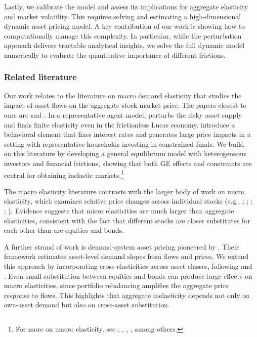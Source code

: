 Lastly, we calibrate the model and assess its implications for aggregate elasticity and market volatility. This requires solving and estimating a high-dimensional dynamic asset pricing model. A key contribution of our work is showing how to computationally manage this complexity. In particular, while the perturbation approach delivers tractable analytical insights, we solve the full dynamic model numerically to evaluate the quantitative importance of different frictions.




\subsubsection*{Related literature}
Our work relates to the literature on macro demand elasticity that studies the impact of asset flows on the aggregate stock market price. The papers closest to ours are \cite{johnson2006dynamic} and \cite{gabaix2020search}. In a representative agent model, \cite{johnson2006dynamic} perturbs the risky asset supply and finds finite elasticity even in the frictionless Lucas economy. \cite{gabaix2020search} introduce a behavioral element that fixes interest rates and generates large price impacts in a setting with representative households investing in constrained funds. We build on this literature by developing a general equilibrium model with heterogeneous investors and financial frictions, showing that both GE effects and constraints are central for obtaining inelastic markets.\footnote{For more on macro elasticity, see \cite{johnson2008volume,johnson2009liquid}, \cite{Deuskar/Johnson/2011}, \cite{Li/Pearson/Zhang/2020}, \cite{Hartzmark/Solomon/2021}, among others.} 

The macro elasticity literature contrasts with the larger body of work on micro elasticity, which examines relative price changes across individual stocks (e.g., \citealp{Shleifer/1986}; \citealp{Harris/Gurel/1986}; \citealp{chang2015regression}; \citealp{pavlova2021benchmarking}; \citealp{Schmickler/2020}). Evidence suggests that micro elasticities are much larger than aggregate elasticities, consistent with the fact that different stocks are closer substitutes for each other than are equities and bonds. 

A further strand of work is demand-system asset pricing pioneered by \cite{Koijen/Yogo/19}. Their framework estimates asset-level demand slopes from flows and prices. We extend this approach by incorporating cross-elasticities across asset classes, following \cite{fuchs2023demand} and \cite{haddad2025causal}. Even small substitution between equities and bonds can produce large effects on macro elasticities, since portfolio rebalancing amplifies the aggregate price response to flows. This highlights that aggregate inelasticity depends not only on own-asset demand but also on cross-asset substitution. 

